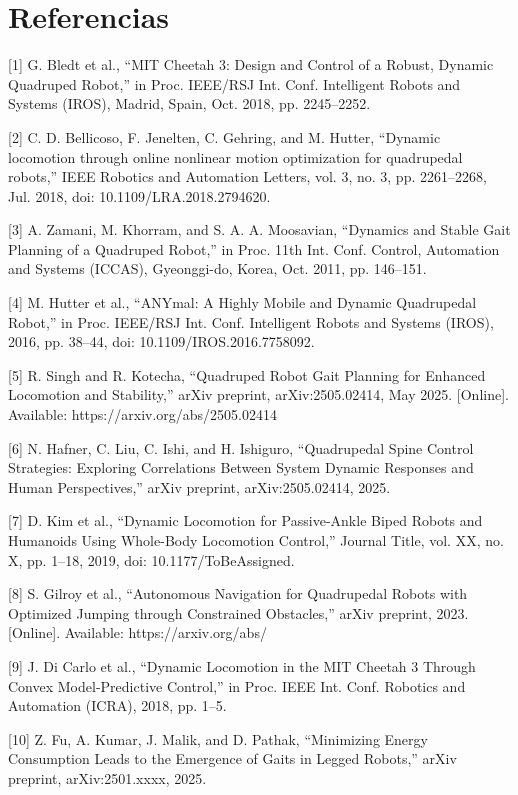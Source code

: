 \chapter{Referencias}


[1] G. Bledt et al., “MIT Cheetah 3: Design and Control of a Robust, Dynamic Quadruped Robot,” in Proc. IEEE/RSJ Int. Conf. Intelligent Robots and Systems (IROS), Madrid, Spain, Oct. 2018, pp. 2245–2252.

[2] C. D. Bellicoso, F. Jenelten, C. Gehring, and M. Hutter, “Dynamic locomotion through online nonlinear motion optimization for quadrupedal robots,” IEEE Robotics and Automation Letters, vol. 3, no. 3, pp. 2261–2268, Jul. 2018, doi: 10.1109/LRA.2018.2794620.

[3] A. Zamani, M. Khorram, and S. A. A. Moosavian, “Dynamics and Stable Gait Planning of a Quadruped Robot,” in Proc. 11th Int. Conf. Control, Automation and Systems (ICCAS), Gyeonggi-do, Korea, Oct. 2011, pp. 146–151.

[4] M. Hutter et al., “ANYmal: A Highly Mobile and Dynamic Quadrupedal Robot,” in Proc. IEEE/RSJ Int. Conf. Intelligent Robots and Systems (IROS), 2016, pp. 38–44, doi: 10.1109/IROS.2016.7758092.

[5] R. Singh and R. Kotecha, “Quadruped Robot Gait Planning for Enhanced Locomotion and Stability,” arXiv preprint, arXiv:2505.02414, May 2025. [Online]. Available: https://arxiv.org/abs/2505.02414

[6] N. Hafner, C. Liu, C. Ishi, and H. Ishiguro, “Quadrupedal Spine Control Strategies: Exploring Correlations Between System Dynamic Responses and Human Perspectives,” arXiv preprint, arXiv:2505.02414, 2025.

[7] D. Kim et al., “Dynamic Locomotion for Passive-Ankle Biped Robots and Humanoids Using Whole-Body Locomotion Control,” Journal Title, vol. XX, no. X, pp. 1–18, 2019, doi: 10.1177/ToBeAssigned.

[8] S. Gilroy et al., “Autonomous Navigation for Quadrupedal Robots with Optimized Jumping through Constrained Obstacles,” arXiv preprint, 2023. [Online]. Available: https://arxiv.org/abs/

[9] J. Di Carlo et al., “Dynamic Locomotion in the MIT Cheetah 3 Through Convex Model-Predictive Control,” in Proc. IEEE Int. Conf. Robotics and Automation (ICRA), 2018, pp. 1–5.

[10] Z. Fu, A. Kumar, J. Malik, and D. Pathak, “Minimizing Energy Consumption Leads to the Emergence of Gaits in Legged Robots,” arXiv preprint, arXiv:2501.xxxx, 2025.

